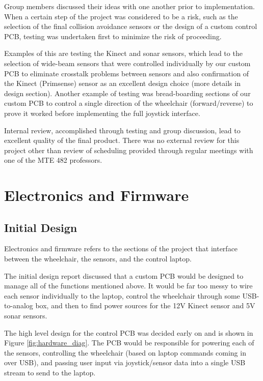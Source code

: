 \documentclass[oneside,final,a4paper]{report}
\begin{document}
Group members discussed their ideas with one another prior to implementation. When a certain step of the project was considered to be a risk, such as the selection of the final collision avoidance sensors or the design of a custom control PCB, testing was undertaken first to minimize the risk of proceeding. 

Examples of this are testing the Kinect and sonar sensors, which lead to the selection of wide-beam sensors that were controlled individually by our custom PCB to eliminate crosstalk problems between sensors and also confirmation of the Kinect (Primsense) sensor as an excellent design choice (more details in design section). Another example of testing was bread-boarding sections of our custom PCB to control a single direction of the wheelchair (forward/reverse) to prove it worked before implementing the full joystick interface.

Internal review, accomplished through testing and group discussion, lead to excellent quality of the final product. There was no external review for this project other than review of scheduling provided through regular meetings with one of the MTE 482 professors.

\chapter{Electronics and Firmware}

\section{Initial Design}
Electronics and firmware refers to the sections of the project that interface between the wheelchair, the sensors, and the control laptop.

The initial design report discussed that a custom PCB would be designed to manage all of the functions mentioned above. It would be far too messy to wire each sensor individually to the laptop, control the wheelchair through some USB-to-analog box, and then to find power sources for the 12V Kinect sensor and 5V sonar sensors.

The high level design for the control PCB was decided early on and is shown in Figure \ref{fig:hardware_diag}. The PCB would be responsible for powering each of the sensors, controlling the wheelchair (based on laptop commands coming in over USB), and passing user input via joystick/sensor data into a single USB stream to send to the laptop.
\end{document}
